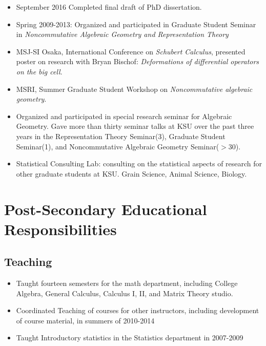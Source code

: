 \documentclass[a4paper,10pt,notitlepage]{article}
\begin{document}
	\begin{itemize}

	\vspace{-5pt}\item September 2016 Completed final draft of PhD dissertation.

	\vspace{-5pt}\item Spring 2009-2013: Organized and participated in Graduate Student Seminar in \textit{Noncommutative Algebraic Geometry and Representation Theory}

	\vspace{-5pt}\item	MSJ-SI Osaka, International Conference on \emph{Schubert Calculus}, presented poster on research with Bryan Bischof: \emph{Deformations of differential operators on the big cell}.

	\vspace{-5pt}\item	MSRI, Summer Graduate Student Workshop on \emph{Noncommutative algebraic geometry}.


	\vspace{-5pt}\item 	Organized and participated in special research seminar for Algebraic Geometry. Gave more than thirty seminar talks at KSU over the past three years in the Representation Theory Seminar(3), Graduate Student Seminar(1), and Noncommutative Algebraic Geometry Seminar($>30$).

	\vspace{-5pt}\item 	Statistical Consulting Lab: consulting on the statistical aspects of research for other graduate students at KSU. Grain Science, Animal Science, Biology.
	\end{itemize}


	\vspace{-10pt}\section*{Post-Secondary Educational Responsibilities}
	\vspace{-7pt}\subsection*{Teaching} \begin{itemize} \vspace{-5pt}\item Taught fourteen semesters for the math department, including College Algebra, General Calculus, Calculus I, II, and Matrix Theory studio. \vspace{-5pt}\item Coordinated Teaching of courses for other instructors, including development of course material, in summers of 2010-2014 \item Taught Introductory statistics in the Statistics department in 2007-2009 \end{itemize}
\end{document}
